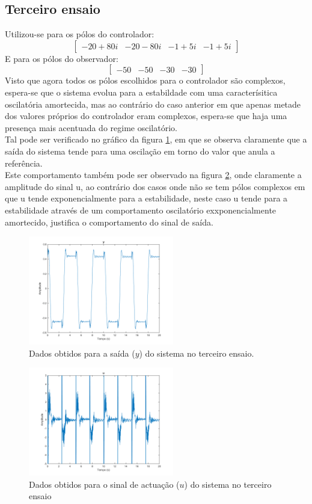 \documentclass[%
  reprint,
  nofootinbib,
  amsmath,amssymb,
  aps,
  10pt,
  a4paper
]{revtex4-1}
\begin{document}
\subsection{Terceiro ensaio}
Utilizou-se para os pólos do controlador:
\begin{equation}
\begin{bmatrix}
-20+80i & -20-80i  & -1+5i &-1+5i
\end{bmatrix}
\end{equation}
E para os pólos do observador:
\begin{equation}
\begin{bmatrix}
-50 & -50  & -30 &-30
\end{bmatrix}
\end{equation}
Visto que agora todos os pólos escolhidos para o controlador são complexos, espera-se que o sistema evolua para a estabildade com uma caracterísitica oscilatória amortecida, mas  ao contrário do caso anterior em que apenas metade dos valores próprios do controlador eram complexos, espera-se que haja uma presença mais acentuada do regime oscilatório.\\
Tal pode ser verificado no gráfico da figura \ref{fig:y_e}, em que se observa claramente que a saída do sistema tende para uma oscilação em torno do valor que anula a referência.\\
Este comportamento também pode ser observado na figura \ref{fig:u_e}, onde claramente a amplitude do sinal u, ao contrário dos casos onde não se tem pólos complexos em que u tende exponencialmente para a estabilidade, neste caso u tende para a estabilidade através de um comportamento oscilatório exxponencialmente amortecido, justifica o comportamento do sinal de saída.
\begin{figure}[H]
\includegraphics[width=2.5in]{../imgs/dados_00_e/dados_00_e_y.png}
\caption{Dados obtidos para a saída ($y$) do sistema no terceiro ensaio.}
\label{fig:y_e}
\end{figure}
\begin{figure}[H]
\includegraphics[width=2.5in]{../imgs/dados_00_e/dados_00_e_u.png}
\caption{Dados obtidos para o sinal de actuação ($u$) do sistema no terceiro ensaio}
\label{fig:u_e}
\end{figure}
\end{document}
